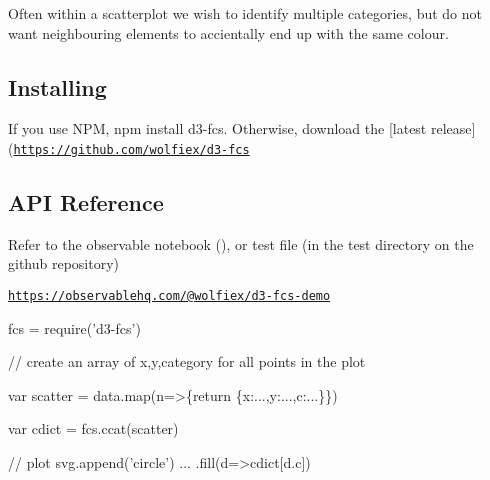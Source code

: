 Often within a scatterplot we wish to identify multiple categories, but do not want neighbouring elements to accientally end up with the same colour.

\subsection*{Installing}

If you use N\+PM, {\ttfamily npm install d3-\/fcs}. Otherwise, download the \mbox{[}latest release\mbox{]}(\href{https://github.com/wolfiex/d3-fcs}{\tt https\+://github.\+com/wolfiex/d3-\/fcs}

\subsection*{A\+PI Reference}

Refer to the observable notebook (), or test file (in the test directory on the github repository)

\href{https://observablehq.com/@wolfiex/d3-fcs-demo}{\tt https\+://observablehq.\+com/@wolfiex/d3-\/fcs-\/demo}


\begin{DoxyCode}
fcs = require('d3-fcs')

// create an array of x,y,category for all points in the plot

var scatter = data.map(n=>\{return \{x:...,y:...,c:...\}\})

var cdict = fcs.ccat(scatter)


// plot
svg.append('circle')
    ...
    .fill(d=>cdict[d.c])
\end{DoxyCode}
 